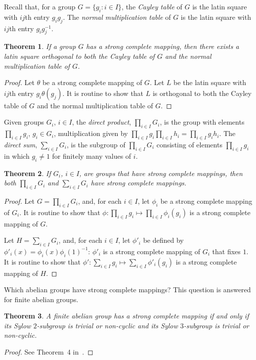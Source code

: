 \documentclass[12pt,a4paper]{article}
\newtheorem{thm}{Theorem}[section]
\begin{document}
Recall that, for a group $G=\{g_i : i\in I\}$, the {\em Cayley table} of $G$ is the latin square with $ij$th entry $g_ig_j$. The {\em normal multiplication table} of $G$ is the latin square with $ij$th entry $g_ig_j^{-1}$.

\begin{thm}
If a group $G$ has a strong complete mapping, then there exists a latin square orthogonal to both the Cayley table of $G$ and the normal multiplication table of $G$.
\end{thm}
\begin{proof}
Let $\theta$ be a strong complete mapping of $G$. Let $L$ be the latin square with $ij$th entry $g_i\theta(g_j)$. It is routine to show that $L$ is orthogonal to both the Cayley table of $G$ and the normal multiplication table of $G$.
\end{proof}

Given groups $G_i$, $i\in I$, the {\em direct product}, $\prod_{i\in I}G_i$, is the group with elements $\prod_{i\in I}g_i$, $g_i\in G_i$, multiplication given by $\prod_{i\in I}g_i\prod_{i\in I}h_i=\prod_{i\in I}g_ih_i$. The {\em direct sum}, $\sum_{i\in I}G_i$, is the subgroup of $\prod_{i\in I}G_i$ consisting of elements $\prod_{i\in I}g_i$ in which $g_i\ne 1$ for finitely many values of $i$. 

\begin{thm}\label{thm:direct}
If $G_i$, $i\in I$, are groups that have strong complete mappings, then both $\prod_{i\in I}G_i$ and $\sum_{i\in I}G_i$ have strong complete mappings.
\end{thm}
\begin{proof}
Let $G=\prod_{i\in I}G_i$, and, for each $i\in I$, let $\phi_i$ be a strong complete mapping of $G_i$. It is routine to show that $\phi\colon \prod_{i\in I}g_i\mapsto \prod_{i\in I}\phi_i(g_i)$ is a strong complete mapping of $G$.
 
Let $H=\sum_{i\in I}G_i$, and, for each $i\in I$, let $\phi'_i$ be defined by $\phi'_i(x)=\phi_i(x)\phi_i(1)^{-1}$: $\phi'_i$ is a strong complete mapping of $G_i$ that fixes $1$. It is routine to show that $\phi'\colon \sum_{i\in I}g_i\mapsto \sum_{i\in I}\phi'_i(g_i)$ is a strong complete mapping of $H$.
\end{proof}

Which abelian groups have strong complete mappings? This question is answered for finite abelian groups. 

\begin{thm}\label{thm:finite2gps}
A finite abelian  group has a strong complete mapping if and only if its Sylow $2$-subgroup is trivial or non-cyclic and its Sylow $3$-subgroup is trivial or non-cyclic.
\end{thm}
\begin{proof}
See Theorem~4 in~\cite{Evans12}.
\end{proof}
\end{document}
